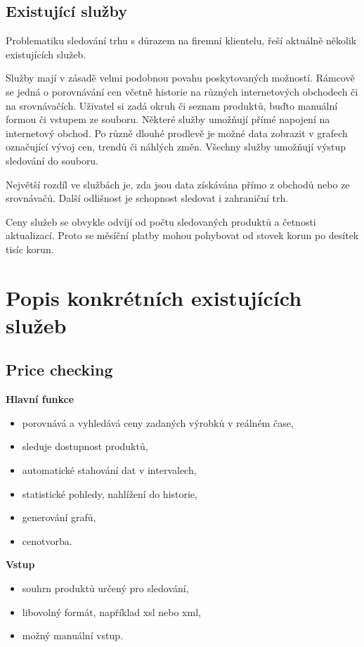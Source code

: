 \documentclass[thesis=B,czech]{FITthesis}[2012/06/26]
\begin{document}
\subsection{Existující služby}

Problematiku sledování trhu s důrazem na firemní klientelu, řeší aktuálně několik existujících služeb.
\par
Služby mají v zásadě velmi podobnou povahu poskytovaných možností. Rámcově se jedná o porovnávání cen včetně historie na různých internetových
obchodech či na srovnávačích. Uživatel si zadá okruh či seznam produktů, buďto manuální formou či vstupem ze souboru. Některé služby umožňují přímé napojení na internetový obchod. Po různě dlouhé prodlevě je možné data zobrazit v grafech označující vývoj cen, trendů či náhlých změn.
Všechny služby umožňují výstup sledování do souboru.
\par
Největší rozdíl ve službách je, zda jsou data získávána přímo z obchodů nebo ze srovnávačů. Další odlišnost je schopnost sledovat i zahraniční trh.
\par
Ceny služeb se obvykle odvíjí od počtu sledovaných produktů a četnosti aktualizací. Proto se měsíční platby mohou 
pohybovat od stovek korun po desítek tisíc korun.

\section{Popis konkrétních existujících služeb}

\subsection{Price checking\cite{priceChecking}} 


\textbf{Hlavní funkce}
\begin{itemize}
\item porovnává a vyhledává ceny zadaných výrobků v reálném čase,
\item sleduje dostupnost produktů,
\item automatické stahování dat v intervalech,
\item statistické pohledy, nahlížení do historie,
\item generování grafů,
\item cenotvorba.
\end{itemize}

\newpage

\textbf{Vstup}
\begin{itemize}
\item souhrn produktů určený pro sledování,
\item libovolný formát, například xsl nebo xml,
\item možný manuální vstup.
\end{itemize}
\end{document}
